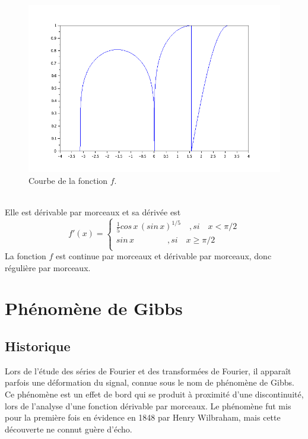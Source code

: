 \documentclass[a4paper,12pt]{report}
\begin{document}
\begin{enumerate}
	\begin{figure}[h!]
		\centering
		\includegraphics[scale=0.6]{ex2_fig5.png}
		\caption{\label{figure5}Courbe de la fonction $f$.}
		\end{figure}
		\\
	Elle est d\'erivable par morceaux et sa d\'eriv\'ee est \[f'(x)=
  \left\{
      \begin{aligned}
        \frac{1}{5}cos\,x\,(sin\,x)^{1/5}\quad , si\quad x < \pi/2\\
        sin\,x\qquad \qquad ,si\quad x \ge \pi/2\\
      \end{aligned}
    \right.\]
	La fonction $f$ est continue par morceaux et d\'erivable par morceaux, donc r\'eguli\`ere par morceaux.
	\end{enumerate}
	
\chapter{Ph\'enom\`ene de Gibbs}
\section{Historique}

Lors de l'\'etude des s\'eries de Fourier et des transform\'ees de Fourier, il appara\^it parfois une d\'eformation du signal, connue sous le nom de ph\'enom\`ene de Gibbs. Ce ph\'enom\`ene est un effet de bord qui se produit \`a proximit\'e d'une discontinuit\'e, lors de l'analyse d'une fonction d\'erivable par morceaux.
Le ph\'enom\`ene fut mis pour la premi\`ere fois en \'evidence en 1848 par Henry Wilbraham, mais cette d\'ecouverte ne connut gu\`ere d'\'echo.
\end{document}

